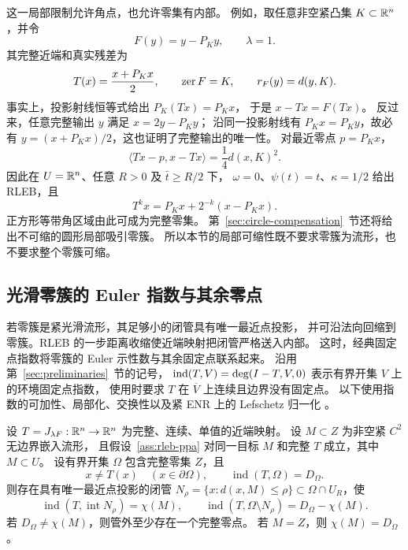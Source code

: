 这一局部限制允许角点，也允许零集有内部。
例如，取任意非空紧凸集 $K\subset\mathbb R^n$，并令
\[
 F(y)=y-P_Ky,\qquad\lambda=1.
\]
其完整近端和真实残差为
\begin{equation}
\label{eq:convex-zero-set-prox}
 T(x)=\frac{x+P_Kx}{2},\qquad
 \operatorname{zer} F=K,\qquad r_F(y)=d(y,K).
\end{equation}
事实上，投影射线恒等式给出 $P_K(Tx)=P_Kx$，
于是 $x-Tx=F(Tx)$。
反过来，任意完整输出 $y$ 满足 $x=2y-P_Ky$；
沿同一投影射线有 $P_Kx=P_Ky$，故必有
$y=(x+P_Kx)/2$，这也证明了完整输出的唯一性。
对最近零点 $p=P_Kx$，
\[
 \langle Tx-p,x-Tx\rangle=\frac14d(x,K)^2.
\]
因此在 $U=\mathbb R^n$、任意 $R>0$ 及 $\bar t\ge R/2$ 下，
$\omega=0$、$\psi(t)=t$、$\kappa=1/2$ 给出 RLEB，且
\[
 T^kx=P_Kx+2^{-k}(x-P_Kx).
\]
正方形等带角区域由此可成为完整零集。
第~\ref{sec:circle-compensation}~节还将给出不可缩的圆形局部吸引零簇。
所以本节的局部可缩性既不要求零簇为流形，也不要求整个零簇可缩。

\subsection{光滑零簇的 Euler 指数与其余零点}
\label{sec:euler-index-balance}

若零簇是紧光滑流形，其足够小的闭管具有唯一最近点投影，
并可沿法向回缩到零簇。RLEB 的一步距离收缩使近端映射把闭管严格送入内部。
这时，经典固定点指数将零簇的 Euler 示性数与其余固定点联系起来。
沿用第~\ref{sec:preliminaries}~节的记号，
$\operatorname{ind}(T,V)=\deg(I-T,V,0)$ 表示有界开集 $V$ 上的环境固定点指数，
使用时要求 $T$ 在 $\overline V$ 上连续且边界没有固定点。
以下使用指数的可加性、局部化、交换性以及紧 ENR 上的 Lefschetz 归一化
\cite[Section~2.1]{BenjaminGottliebCollars}。

\begin{theorem}[零簇的指数平衡]
\label{thm:index-balance}
\label{prop:index-balance}
设 $T=J_{\lambda F}:\mathbb R^n\to\mathbb R^n$ 为完整、连续、单值的近端映射。
设 $M\subset Z$ 为非空紧 $C^2$ 无边界嵌入流形，
且假设~\ref{ass:rleb-ppa} 对同一目标 $M$ 和完整 $T$ 成立，其中 $M\subset U$。
设有界开集 $\Omega$ 包含完整零集 $Z$，且
\[
 x\ne T(x)\quad(x\in\partial\Omega),\qquad
 \operatorname{ind}(T,\Omega)=D_\Omega.
\]
则存在具有唯一最近点投影的闭管
$N_\rho=\{x:d(x,M)\le\rho\}\subset\Omega\cap U_R$，使
\begin{equation}
\label{eq:index-balance}
 \operatorname{ind}(T,\operatorname{int}N_\rho)=\chi(M),\qquad
 \operatorname{ind}(T,\Omega\setminus N_\rho)=D_\Omega-\chi(M).
\end{equation}
若 $D_\Omega\ne\chi(M)$，则管外至少存在一个完整零点。
若 $M=Z$，则 $\chi(M)=D_\Omega$。
\end{theorem}

